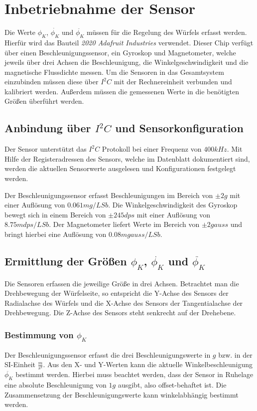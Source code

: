 \documentclass{article}
\begin{document}
\section{Inbetriebnahme der Sensor}
Die Werte $\phi_K$, $\dot{\phi_K}$ und $\ddot{\phi_K}$ müssen für die Regelung des Würfels erfasst werden. Hierfür wird das Bauteil \textit{2020 Adafruit Industries} verwendet. Dieser Chip verfügt über einen Beschleunigungssensor, ein Gyroskop und Magnetometer, welche jeweils über drei Achsen die Beschleunigung, die Winkelgeschwindigkeit und die magnetische Flussdichte messen. 
Um die Sensoren in das Gesamtsystem einzubinden müssen diese über $I^2C$ mit der Rechnereinheit verbunden und kalibriert werden. Außerdem müssen die gemessenen Werte in die benötigten Größen überführt werden.

\subsection{Anbindung über $I^2C$ und Sensorkonfiguration}
Der Sensor unterstützt das $I^2C$ Protokoll bei einer Frequenz von $400k Hz$. Mit Hilfe der Registeradressen des Sensors, welche im Datenblatt dokumentiert sind, werden die aktuellen Sensorwerte ausgelesen und Konfigurationen festgelegt werden.

Der Beschleunigungssensor erfasst Beschleunigungen im Bereich von $\pm2 g$ mit einer Auflösung von $0.061 mg / LSb$. Die Winkelgeschwindigkeit des Gyroskop bewegt sich in einem Bereich von $\pm 245 dps$ mit einer Auflösung von $8.75 mdps / LSb$. Der Magnetometer liefert Werte im Bereich von $\pm 2gauss$ und bringt hierbei eine Auflösung von $0.08 mgauss / LSb$.

\subsection{Ermittlung der Größen $\phi_K$, $\dot{\phi_K}$ und $\ddot{\phi_K}$}
Die Sensoren erfassen die jeweilige Größe in drei Achsen. Betrachtet man die Drehbewegung der Würfelseite, so entspricht die Y-Achse des Sensors der Radialachse des Würfels und die X-Achse des Sensors der Tangentialachse der Drehbewegung. Die Z-Achse des Sensors steht senkrecht auf der Drehebene.

\subsubsection{Bestimmung von $\phi_K$}
Der Beschleunigungssensor erfasst die drei Beschleunigungswerte in $g$ bzw. in der SI-Einheit $\frac{m}{s^2}$. Aus den X- und Y-Werten kann die aktuelle Winkelbeschleunigung $\ddot{\phi_K}$ bestimmt werden. Hierbei muss beachtet werden, dass der Sensor in Ruhelage eine absolute Beschleunigung von $1g$ ausgibt, also offset-behaftet ist. Die Zusammensetzung der Beschleunigungswerte kann winkelabhängig bestimmt werden.
\end{document}
